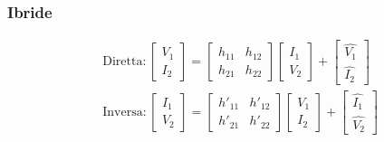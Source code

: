 \documentclass[10pt]{article}
\begin{document}
        \hfill
        \begin{minipage}[t]{.5\textwidth}
            \vspace{-\baselineskip}

            \subsubsection*{Ibride}
            \vspace{-\baselineskip}

                \begin{align*}
                    &\text{Diretta}:
                        \begin{bmatrix}
                            V_1\\
                            I_2
                        \end{bmatrix}
                        =
                        \begin{bmatrix}
                            h_{11} & h_{12}\\
                            h_{21} & h_{22}
                        \end{bmatrix}
                        \begin{bmatrix}
                            I_1\\
                            V_2
                        \end{bmatrix}
                        +
                        \begin{bmatrix}
                            \hat{V_1}\\
                            \hat{I_2}
                        \end{bmatrix}\\
                    &\text{Inversa}:
                        \begin{bmatrix}
                            I_1\\
                            V_2
                        \end{bmatrix}
                        =
                        \begin{bmatrix}
                            h'_{11} & h'_{12}\\
                            h'_{21} & h'_{22}
                        \end{bmatrix}
                        \begin{bmatrix}
                            V_1\\
                            I_2
                        \end{bmatrix}
                        +
                        \begin{bmatrix}
                            \hat{I_1}\\
                            \hat{V_2}
                        \end{bmatrix}
                \end{align*}


\end{minipage}
\end{document}
